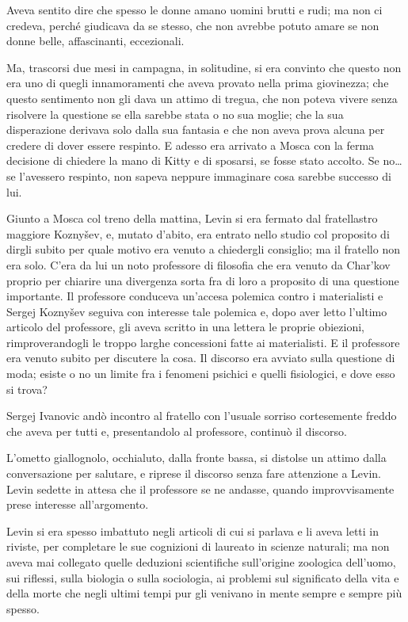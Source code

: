 Aveva sentito dire che spesso le donne amano uomini brutti e rudi; ma non ci credeva, perché giudicava da se stesso, che non avrebbe potuto amare se non donne belle, affascinanti, eccezionali. 

Ma, trascorsi due mesi in campagna, in solitudine, si era convinto che questo non era uno di quegli innamoramenti che aveva provato nella prima giovinezza; che questo sentimento non gli dava un attimo di tregua, che non poteva vivere senza risolvere la questione se ella sarebbe stata o no sua moglie; che la sua disperazione derivava solo dalla sua fantasia e che non aveva prova alcuna per credere di dover essere respinto. E adesso era arrivato a Mosca con la ferma decisione di chiedere la mano di Kitty e di sposarsi, se fosse stato accolto. Se no\ldots{} se l'avessero respinto, non sapeva neppure immaginare cosa sarebbe successo di lui. 

\label{vii} 

Giunto a Mosca col treno della mattina, Levin si era fermato dal fratellastro maggiore Koznyšev, e, mutato d'abito, era entrato nello studio col proposito di dirgli subito per quale motivo era venuto a chiedergli consiglio; ma il fratello non era solo. C'era da lui un noto professore di filosofia che era venuto da Char'kov proprio per chiarire una divergenza sorta fra di loro a proposito di una questione importante. Il professore conduceva un'accesa polemica contro i materialisti e Sergej Koznyšev seguiva con interesse tale polemica e, dopo aver letto l'ultimo articolo del professore, gli aveva scritto in una lettera le proprie obiezioni, rimproverandogli le troppo larghe concessioni fatte ai materialisti. E il professore era venuto subito per discutere la cosa. Il discorso era avviato sulla questione di moda; esiste o no un limite fra i fenomeni psichici e quelli fisiologici, e dove esso si trova? 

Sergej Ivanovic andò incontro al fratello con l'usuale sorriso cortesemente freddo che aveva per tutti e, presentandolo al professore, continuò il discorso. 

L'ometto giallognolo, occhialuto, dalla fronte bassa, si distolse un attimo dalla conversazione per salutare, e riprese il discorso senza fare attenzione a Levin. Levin sedette in attesa che il professore se ne andasse, quando improvvisamente prese interesse all'argomento. 

Levin si era spesso imbattuto negli articoli di cui si parlava e li aveva letti in riviste, per completare le sue cognizioni di laureato in scienze naturali; ma non aveva mai collegato quelle deduzioni scientifiche sull'origine zoologica dell'uomo, sui riflessi, sulla biologia o sulla sociologia, ai problemi sul significato della vita e della morte che negli ultimi tempi pur gli venivano in mente sempre e sempre più spesso. 

